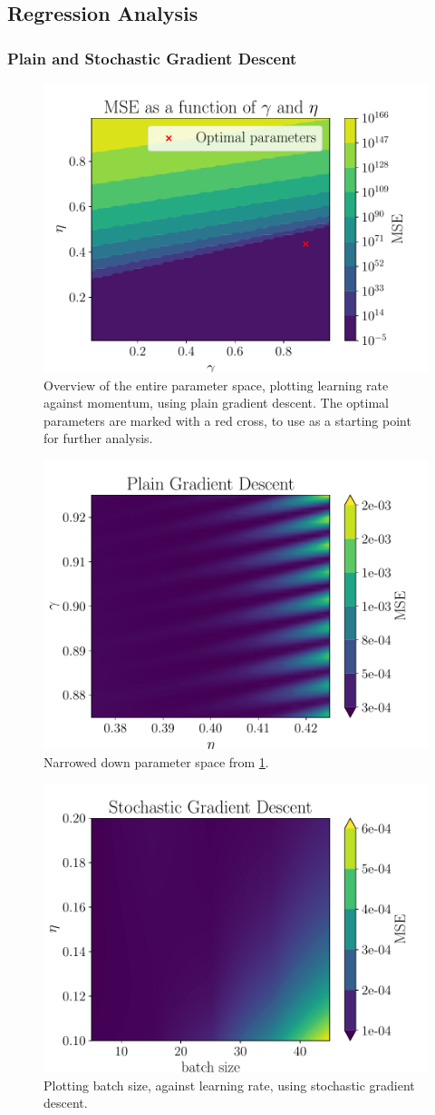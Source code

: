 \subsection{Regression Analysis}
\subsubsection{Plain and Stochastic Gradient Descent}
\begin{figure}[ht!]
    \centering
    \includegraphics[width = .475\textwidth]{../figs/a_2_parameter_overview.pdf}
    \caption{Overview of the entire parameter space, plotting learning rate against momentum,  using plain gradient descent. The optimal parameters are marked with a red cross, to use as a starting point for further analysis.}
    \label{fig: param_overview}
\end{figure}
\begin{figure}[ht!]
    \centering
    \includegraphics[width = .475\textwidth]{../figs/GD_eta_gamma.pdf}
    \caption{Narrowed down parameter space from \cref{fig: param_overview}.}
    \label{fig: param_narrowed}
\end{figure}
\begin{figure}[ht!]
    \centering
    \includegraphics[width = .475\textwidth]{../figs/SGD_batch_eta_.pdf}
    \caption{Plotting batch size, against learning rate, using stochastic gradient descent.}
    \label{fig: SGD_batch_eta}
\end{figure}
